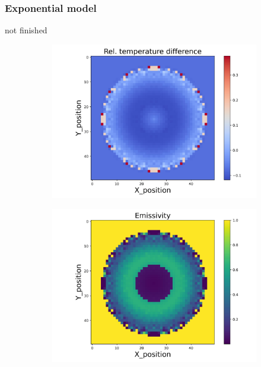 \subsubsection{Exponential model}
not finished
\begin{figure}[htbp]
    \centering
    \begin{minipage}{\textwidth}
        \centering
        \begin{subfigure}{0.49\textwidth}
            \centering
            \includegraphics[width=\textwidth]{figures/raw_data/31/mix/T_bias.jpg}
        \end{subfigure}
        \begin{subfigure}{0.49\textwidth}
            \centering
            \includegraphics[width=\textwidth]{figures/raw_data/31/mix/emi_cal.jpg}

\end{subfigure}
\end{minipage}
\end{figure}
